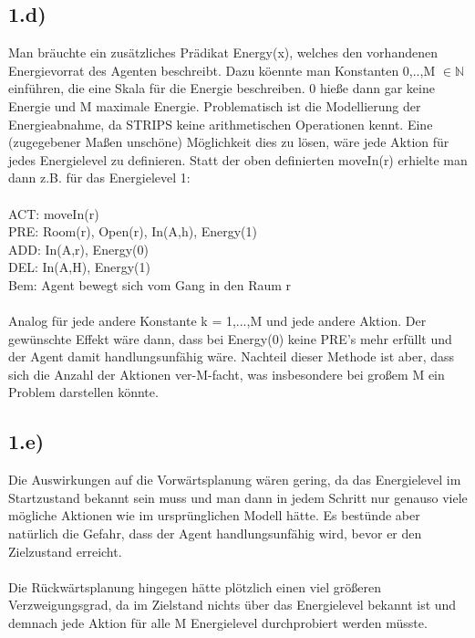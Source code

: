 \documentclass[a4paper]{article}
\newcommand{\IN}{\mathbb{N}}
\begin{document}
\subsection*{1.d)}
Man br\"auchte ein zus\"atzliches Pr\"adikat Energy(x), welches den vorhandenen Energievorrat des Agenten beschreibt. Dazu k\"oennte man Konstanten 0,..,M $\in \IN$ einf\"uhren, die eine Skala f\"ur die Energie beschreiben. 0 hie{\ss}e dann gar keine Energie und M maximale Energie. Problematisch ist die Modellierung der Energieabnahme, da STRIPS keine arithmetischen Operationen kennt. Eine (zugegebener Ma{\ss}en unsch\"one) M\"oglichkeit dies zu l\"osen, w\"are jede Aktion f\"ur jedes Energielevel zu definieren. Statt der oben definierten moveIn(r) erhielte man dann z.B. f\"ur das Energielevel 1:\\
\\
ACT: moveIn(r)\\
PRE: Room(r), Open(r), In(A,h), Energy(1)\\
ADD: In(A,r), Energy(0)\\
DEL: In(A,H), Energy(1)\\
Bem: Agent bewegt sich vom Gang in den Raum r\\
\\
Analog f\"ur jede andere Konstante k = 1,...,M und jede andere Aktion. Der gew\"unschte Effekt w\"are dann, dass bei Energy(0) keine PRE's mehr erf\"ullt und der Agent damit handlungsunf\"ahig w\"are. Nachteil dieser Methode ist aber, dass sich die Anzahl der Aktionen ver-M-facht, was insbesondere bei gro{\ss}em M ein Problem darstellen k\"onnte.

\subsection*{1.e)}
Die Auswirkungen auf die Vorw\"artsplanung w\"aren gering, da das Energielevel im Startzustand bekannt sein muss und man dann in jedem Schritt nur genauso viele m\"ogliche Aktionen wie im urspr\"unglichen Modell h\"atte. Es best\"unde aber nat\"urlich die Gefahr, dass der Agent handlungsunf\"ahig wird, bevor er den Zielzustand erreicht. \\
\\
Die R\"uckw\"artsplanung hingegen h\"atte pl\"otzlich einen viel gr\"o{\ss}eren Verzweigungsgrad, da im Zielstand nichts \"uber das Energielevel bekannt ist und demnach jede Aktion f\"ur alle M Energielevel durchprobiert werden m\"usste.
\end{document}
